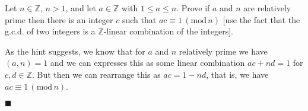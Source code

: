 \documentclass[12pt]{article}
\renewcommand{\qed}{\hfill$\blacksquare$}
\renewenvironment{proof}{\begin{addmargin}[1em]{0em}\begin{newproof}}{\end{newproof}\end{addmargin}\qed}
\newenvironment{problem}[2][Exercise]{\begin{trivlist}
\item[\hskip \labelsep {\bfseries #1}\hskip \labelsep {\bfseries #2.}]}{\end{trivlist}}
\begin{document}
\begin{problem}{0.3.13}
Let $n\in \mathbb{Z}$, $n>1$, and let $a\in \mathbb{Z}$ with $1\leq a \leq n$. Prove if $a$ and $n$ are relatively prime then there is an integer $c$ such that $ac \equiv 1 \, \left(\text{mod}\, n\right)$ [use the fact that the g.c.d. of two integers is a $\mathbb{Z}$-linear combination of the integers].
\end{problem}
\begin{proof}
As the hint suggests, we know that for $a$ and $n$ relatively prime we have $\left(a,n\right)=1$ and we can expresses this as some linear combination $ ac +  nd = 1$ for $c,d \in \mathbb{Z}$. But then we can rearrange this as $ac = 1 - nd$, that is, we have $ac \equiv 1 \, \left(\text{mod} \, n\right)$.
\end{proof}
\end{document}
